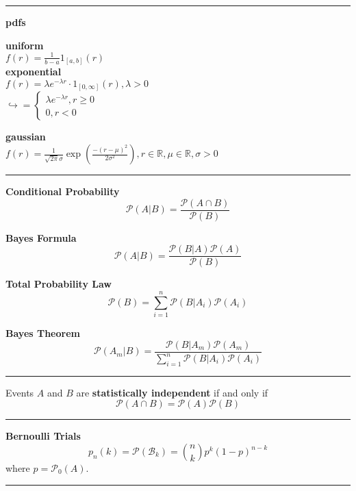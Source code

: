 \documentclass{article}
\renewcommand{\P}{\mathcal{P}}
\providecommand{\B}{\mathcal{B}}
\providecommand{\R}{\mathbb{R}}
\begin{document}
\begin{multicols*}{3}
        \noindent\rule{\columnwidth}{0.4pt}

        \textbf{pdfs}

        \textbf{uniform}\\
        $f(r)=\frac{1}{b-a}1_{[a,b]}(r)$\\

        \textbf{exponential}\\
        $f(r)=\lambda e^{-\lambda r}\cdot 1_{[0,\infty]}(r),\lambda>0$\\
        $\hookrightarrow =
        \begin{cases}
            \lambda e^{-\lambda r},r\geq 0\\
            0,r<0
        \end{cases}$

        \textbf{gaussian}\\
        $f(r)=\frac{1}{\sqrt{2\pi}\sigma}\exp\left(\frac{-(r-\mu)^2}{2\sigma^2}\right), r\in\R,\mu\in\R,\sigma>0$

        \noindent\rule{\columnwidth}{0.4pt}

        \textbf{Conditional Probability}
        \begin{equation*}
            \P(A|B)=\frac{\P(A\cap B)}{\P(B)}
        \end{equation*}

        \textbf{Bayes Formula}
        \begin{equation*}
            \P(A|B)=\frac{\P(B|A)\P(A)}{\P(B)}
        \end{equation*}

        \textbf{Total Probability Law}
        \begin{equation*}
            \P(B)=\sum_{i=1}^{n}\P(B|A_i)\P(A_i)
        \end{equation*}

        \textbf{Bayes Theorem}
        \begin{equation*}
            \P(A_m|B)=\frac{\P(B|A_m)\P(A_m)}{\sum_{i=1}^{n}\P(B|A_i)\P(A_i)}
        \end{equation*}

        \noindent\rule{\columnwidth}{0.4pt}

        Events $A$ and $B$ are \textbf{statistically independent} if and only if
        \begin{equation*}
            \P(A\cap B) = \P(A)\P(B)
        \end{equation*}

        \noindent\rule{\columnwidth}{0.4pt}

        \textbf{Bernoulli Trials}
        \begin{equation*}
            p_n(k)=\P(\B_k)={n\choose k}p^k(1-p)^{n-k}
        \end{equation*}
        where $p=\P_0(A)$.

        \noindent\rule{\columnwidth}{0.4pt}

    \end{multicols*}
\end{document}
